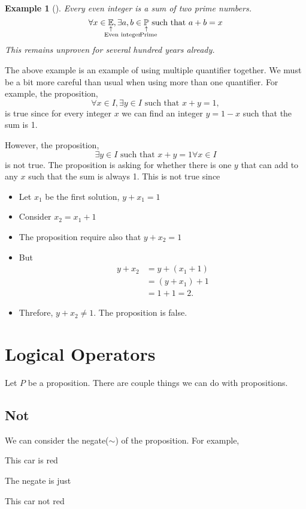 \documentclass[a4paper, 12pt]{article}
\newcommand{\expl}[2]{%
	\underset{\substack{\uparrow\\\mathrlap{\text{\hspace{-1em}#2}}}}{#1}}
\newcommand{\st}{\text{ such that }}
\theoremstyle{examplestyle}
\newtheorem{examplethm}{Example}
\newenvironment{example}[1][]{\begin{mdframed}[style=example]\begin{examplethm}[#1]}{\end{examplethm}\end{mdframed}}
\begin{document}
\begin{multicols}{2}
\begin{example}
	Every even integer is a sum of two prime numbers.
	\[
		\forall x \in \expl{\mathbb{E}}{\text{Even integer}}, \exists a, b \in \expl{\mathbb{P}}{\text{Prime}} \text{ such that } a+b = x
	\]
	This remains unproven for several hundred years already.
\end{example}

The above example is an example of using multiple quantifier together. We must be a bit more careful than usual when using more than one quantifier. For example, the proposition,
\[
	\forall x \in I, \exists y \in I \st x+y = 1,
\]
is true since for every integer $x$ we can find an integer $y = 1-x$ such that the sum is 1.

However, the proposition,
\[
	\exists y \in I \st x+y=1 \forall x\in I
\]
is not true. The proposition is asking for whether there is one $y$ that can add to any $x$ such that the sum is always 1. This is not true since
\begin{itemize}
	\item Let $x_1$ be the first solution, $y+x_1 = 1$
	\item Consider $x_2=x_1+1$
	\item The proposition require also that $y+x_2 = 1$
	\item But
		\begin{align*}
		y+x_2 &= y+(x_1+1)\\
			&= (y+x_1)+1 \\
			&= 1+1 = 2.
		\end{align*}
	\item Threfore, $y + x_2 \ne 1$. The proposition is false.
\end{itemize}

\section*{Logical Operators}
Let $P$ be a proposition. There are couple things we can do with propositions.
\subsection*{Not}
We can consider the negate($\sim$) of the proposition. For example,
\begin{center}
	This car is red
\end{center}
The negate is just
\begin{center}
	This car not red
\end{center}


\end{multicols}
\end{document}
